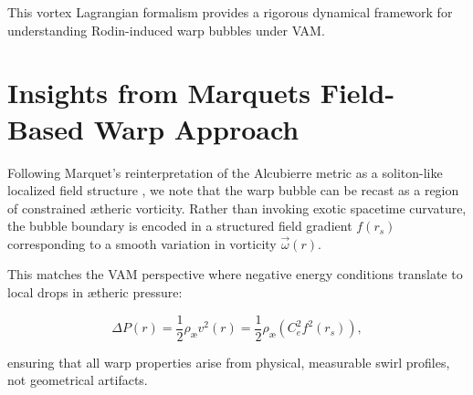 \documentclass[12pt]{article}
\begin{document}
This vortex Lagrangian formalism provides a rigorous dynamical framework for understanding Rodin-induced warp bubbles under VAM.

\section{Insights from Marquet\rqs s Field-Based Warp Approach}

Following Marquet's reinterpretation of the Alcubierre metric as a soliton-like localized field structure \cite{marquet2012warp}, we note that the warp bubble can be recast as a region of constrained ætheric vorticity. Rather than invoking exotic spacetime curvature, the bubble boundary is encoded in a structured field gradient $f(r_s)$ corresponding to a smooth variation in vorticity $\vec{\omega}(r)$.

This matches the VAM perspective where negative energy conditions translate to local drops in ætheric pressure:

\begin{equation}
    \Delta P(r) = \frac{1}{2} \rho_\text{\ae} v^2(r) = \frac{1}{2} \rho_\text{\ae} (C_e^2 f^2(r_s)),
\end{equation}

ensuring that all warp properties arise from physical, measurable swirl profiles, not geometrical artifacts.



\end{document}
